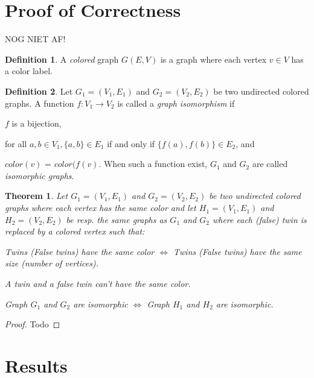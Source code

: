 \documentclass[twoside]{article}
\theoremstyle{definition}
\newtheorem{definition}{Definition}
\theoremstyle{plain}
\newtheorem{theorem}{Theorem}
\begin{document}
\begin{multicols}{2}
\section{Proof of Correctness}
NOG NIET AF!
\begin{definition}
A \emph{colored} graph $G(E,V)$ is a graph where each vertex $v \in V$ has a color label.
\end{definition}
\begin{definition}
Let $G_1 = (V_1, E_1)$ and $G_2 = (V_2, E_2)$ be two undirected colored graphs. A function $f: V_1 \to V_2$ is called a \emph{graph isomorphism} if \begin{compactenum}[\upshape(a)]
\item $f$ is a bijection, 
\item for all $a, b \in V_1, \{a, b\} \in E_1$ if and only if $\{f(a), f(b)\} \in E_2$, and 
\item $color(v)$ = $color (f(v)$. When such a function exist, $G_1$ and $G_2$ are called \emph{isomorphic graphs}. 
\end{compactenum}
\end{definition}
\begin{theorem}
Let $G_1 = (V_1, E_1)$ and $G_2 = (V_2, E_2)$ be two undirected colored graphs where each vertex has the same color and let $H_1 = (V_1, E_1)$ and $H_2 = (V_2, E_2)$ be resp. the same graphs as $G_1$ and $G_2$ where each (false) twin is replaced by a colored vertex such that: \begin{compactenum}[\upshape(a)]
\item Twins (False twins) have the same color $\iff$ Twins (False twins) have the same size (number of vertices).
\item A twin and a false twin can't have the same color.
\end{compactenum}
Graph $G_1$ and $G_2$ are isomorphic $\iff$ Graph $H_1$ and $H_2$ are isomorphic.
\end{theorem}
\begin{proof}
Todo
\end{proof}


\section{Results}


\end{multicols}
\end{document}

